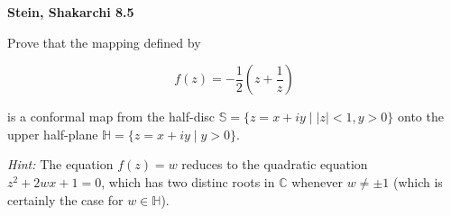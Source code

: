 \textbf{Stein, Shakarchi 8.5}

Prove that the mapping defined by

$$
f(z) = -\frac{1}{2} \left( z + \frac{1}{z} \right)
$$

is a conformal map from the half-disc $\mathbb{S} = \{z = x + iy \mid |z| < 1, y > 0\}$ onto the upper half-plane 
$\mathbb{H} = \{z = x + iy \mid y > 0\}$.

\textit{Hint:} The equation $f(z) = w$ reduces to the quadratic equation $z^2 + 2wx + 1 = 0$, which has two distinc 
roots in $\mathbb{C}$ whenever $w \neq \pm 1$ (which is certainly the case for $w \in \mathbb{H}$).

\begin{solution}
  \ \\
\end{solution}
